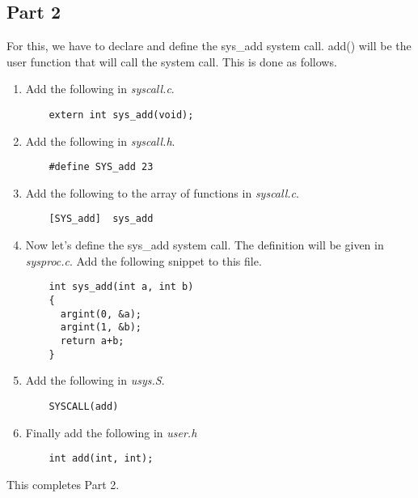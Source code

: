 \documentclass[a4paper]{article}
\begin{document}
\subsection*{Part 2}
For this, we have to declare and define the sys\_add system call. add() will be the user function that will call the system call. This is done as follows.
\begin{enumerate}
	\item Add the following in \textit{syscall.c}.
    \begin{lstlisting}
    extern int sys_add(void);
    \end{lstlisting}
    \item Add the following in \textit{syscall.h}.
    \begin{lstlisting}
    #define SYS_add 23
    \end{lstlisting}
    \item Add the following to the array of functions in \textit{syscall.c}.
    \begin{lstlisting}
    [SYS_add]  sys_add
    \end{lstlisting}
    \item Now let's define the sys\_add system call. The definition will be given in \textit{sysproc.c}. Add the following snippet to this file.
    \newpage
    \begin{lstlisting}
    int sys_add(int a, int b)
    {
      argint(0, &a);
      argint(1, &b);
      return a+b;
    }
    \end{lstlisting}
    \item Add the following in \textit{usys.S}.
    \begin{lstlisting}
    SYSCALL(add)
    \end{lstlisting}
    \item Finally add the following in \textit{user.h}
    \begin{lstlisting}
    int add(int, int);
    \end{lstlisting}
\end{enumerate}

This completes Part 2.
\end{document}
